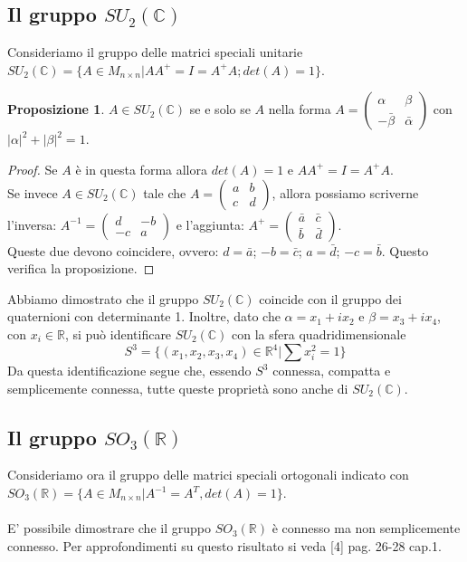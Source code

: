 \documentclass[12pt,a4paper]{report}
\theoremstyle{definition}
\theoremstyle{Theorem}
\newtheorem{Prop}[Def]{Proposizione}
\theoremstyle{definition}
\theoremstyle{definition}
\theoremstyle{definition}
\begin{document}
\subsection{Il gruppo $SU_2(\mathbb{C})$ }
Consideriamo il gruppo delle matrici speciali unitarie $SU_2(\mathbb{C})=\{A\in M_{n\times n}|AA^{+}=I=A^{+}A;det(A)=1\}$.
\begin{Prop}
	$A\in SU_2(\mathbb{C})$ se e solo se $A$ nella forma $A=
	\begin{pmatrix}
		\alpha & \beta \\
		-\bar{\beta} & \bar{\alpha}
	\end{pmatrix}
	$ con $|\alpha|^2+|\beta|^2=1$.
\end{Prop}
\begin{proof}
	Se $A$ è in questa forma allora $det(A)=1$ e $AA^{+}=I=A^{+}A$.\\
	Se invece $A\in SU_2(\mathbb{C})$ tale che $A=
	\begin{pmatrix}
		a & b \\
		c & d
	\end{pmatrix}$, allora possiamo scriverne l'inversa:
$A^{-1}=\begin{pmatrix}
	d & -b \\
	-c & a
\end{pmatrix}$ e l'aggiunta: $A^+=
\begin{pmatrix}
	\bar{a} & \bar{c} \\
	\bar{b} & \bar{d}
\end{pmatrix}$.\\
Queste due devono coincidere, ovvero: $d=\bar{a}$; $-b=\bar{c}$; $a=\bar{d}$; $-c=\bar{b}$. Questo verifica la proposizione.
\end{proof}
Abbiamo dimostrato che il gruppo $SU_2(\mathbb{C})$ coincide con il gruppo dei quaternioni con determinante 1.
Inoltre, dato che $\alpha=x_1+ix_2$ e $\beta=x_3+ix_4$, con $x_i\in\mathbb{R}$, si può identificare $SU_2(\mathbb{C})$ con la sfera quadridimensionale $$S^3=\{(x_1,x_2,x_3,x_4)\in \mathbb{R}^4|\sum x_i^2=1\}$$
Da questa identificazione segue che, essendo $S^3$ connessa, compatta e semplicemente connessa, tutte queste proprietà sono anche di $SU_2(\mathbb{C})$.
\subsection{Il gruppo $SO_3(\mathbb{R})$}
Consideriamo ora il gruppo delle matrici speciali ortogonali indicato con $SO_3(\mathbb{R})=\{A\in M_{n\times n}|A^{-1}=A^T, det(A)=1\}$.\\
\\
E' possibile dimostrare che il gruppo $SO_3(\mathbb{R})$ è connesso ma non semplicemente connesso. Per approfondimenti su questo risultato si veda [4] pag. 26-28 cap.1.
\end{document}
